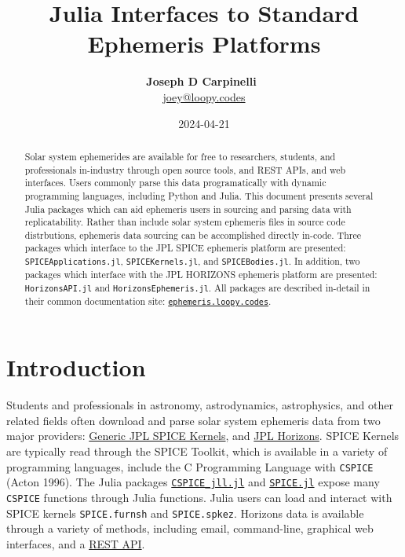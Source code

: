 \documentclass[
]{article}
\title{Julia Interfaces to Standard Ephemeris Platforms}
\author{\textbf{Joseph D
Carpinelli}~\orcidlink{https://orcid.org/0000-0001-8655-8125}\\\href{mailto:joey@loopy.codes}{joey@loopy.codes}}
\date{2024-04-21}
\begin{document}
\maketitle
\begin{abstract}
Solar system ephemerides are available for free to researchers,
students, and professionals in-industry through open source tools, and
REST APIs, and web interfaces. Users commonly parse this data
programatically with dynamic programming languages, including Python and
Julia. This document presents several Julia packages which can aid
ephemeris users in sourcing and parsing data with replicatability.
Rather than include solar system ephemeris files in source code
distrbutions, ephemeris data sourcing can be accomplished directly
in-code. Three packages which interface to the JPL SPICE ephemeris
platform are presented: \texttt{SPICEApplications.jl},
\texttt{SPICEKernels.jl}, and \texttt{SPICEBodies.jl}. In addition, two
packages which interface with the JPL HORIZONS ephemeris platform are
presented: \texttt{HorizonsAPI.jl} and \texttt{HorizonsEphemeris.jl}.
All packages are described in-detail in their common documentation site:
\href{https://ephemeris.loopy.codes}{\texttt{ephemeris.loopy.codes}}.
\end{abstract}

\section{Introduction}\label{sec-intro}

Students and professionals in astronomy, astrodynamics, astrophysics,
and other related fields often download and parse solar system ephemeris
data from two major providers:
\href{https://naif.jpl.nasa.gov/pub/naif/generic_kernels/}{Generic JPL
SPICE Kernels}, and \href{https://ssd.jpl.nasa.gov/horizons/}{JPL
Horizons}. SPICE Kernels are typically read through the SPICE Toolkit,
which is available in a variety of programming languages, include the C
Programming Language with \texttt{CSPICE} (Acton 1996). The Julia
packages
\href{https://github.com/JuliaBinaryWrappers/CSPICE_jll.jl}{\texttt{CSPICE\_jll.jl}}
and \href{https://github.com/JuliaAstro/SPICE.jl}{\texttt{SPICE.jl}}
expose many \texttt{CSPICE} functions through Julia functions. Julia
users can load and interact with SPICE kernels \texttt{SPICE.furnsh} and
\texttt{SPICE.spkez}. Horizons data is available through a variety of
methods, including email, command-line, graphical web interfaces, and a
\href{https://ssd-api.jpl.nasa.gov/doc/horizons.html}{REST API}.
\end{document}
